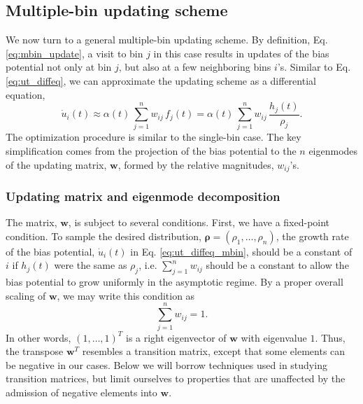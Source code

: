 \documentclass[preprint, superscriptaddress, floatfix]{revtex4-1}
\begin{document}
\subsection{\label{sec:multiple-bin}
Multiple-bin updating scheme}



We now turn to a general multiple-bin updating scheme.
%
By definition, Eq. \eqref{eq:mbin_update},
a visit to bin $j$ in this case results in updates of the bias potential
not only at bin $j$, but also at a few neighboring bins $i$'s.
%
Similar to Eq. \eqref{eq:ut_diffeq},
we can approximate the updating scheme
as a differential equation,
%
\begin{equation}
  \dot u_i(t)
  \approx
  \alpha(t) \,
  \sum_{j=1}^n w_{ij} \, f_j(t)
  =
  \alpha(t) \,
  \sum_{j=1}^n w_{ij} \, \frac{ h_j(t) } { \rho_j }
  .
  \label{eq:ut_diffeq_mbin}
\end{equation}
%
The optimization procedure is similar to
the single-bin case.
%
The key simplification comes from the
projection of the bias potential to the $n$ eigenmodes
of the updating matrix, $\mathbf w$,
formed by the relative magnitudes, $w_{ij}$'s.



\subsubsection{\label{sec:updating-matrix}
Updating matrix and eigenmode decomposition}



The matrix, $\mathbf w$, is subject to several conditions.
%
First, we have a fixed-point condition\cite{bussi2006, dama2014}.
%
To sample the desired distribution,
$\pmb\rho = (\rho_1, \dots, \rho_n)$,
the growth rate of the bias potential,
${\dot u}_i(t)$
in Eq. \eqref{eq:ut_diffeq_mbin},
should be a constant of $i$
if $h_j(t)$ were the same as $\rho_j$,
i.e.
$\sum_{j=1}^n w_{ij}$ should be a constant
to allow the bias potential to grow uniformly
in the asymptotic regime.
%
By a proper overall scaling of $\mathbf w$,
we may write this condition as
%
\begin{equation}
  \sum_{j = 1}^n w_{ij} = 1
  .
\label{eq:w_sumj}
\end{equation}
%
In other words, $(1, \dots, 1)^T$
is a right eigenvector of $\mathbf w$
with eigenvalue $1$.
%
Thus, the transpose $\mathbf w^T$
resembles a transition matrix,
except that some elements can be negative
in our cases.
%
Below we will %
borrow techniques used
in studying transition matrices\cite{vankampen},
but limit ourselves to properties that are unaffected
by the admission of negative elements into $\mathbf w$.
\end{document}
